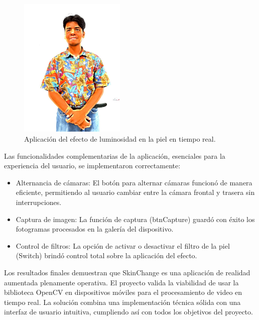 \documentclass[conference]{IEEEtran}
\begin{document}
\begin{figure}[htbp]
\centering
\includegraphics[width=0.45\textwidth]{Imagenes/ejemplo_efecto_aplicado.jpg}
\caption{Aplicación del efecto de luminosidad en la piel en tiempo real.}
\label{fig:efecto_luminosidad}
\end{figure}

Las funcionalidades complementarias de la aplicación, esenciales para la experiencia del usuario, se implementaron correctamente:
\begin{itemize}
\item Alternancia de cámaras: El botón para alternar cámaras funcionó de manera eficiente, permitiendo al usuario cambiar entre la cámara frontal y trasera sin interrupciones.
\item Captura de imagen: La función de captura (btnCapture) guardó con éxito los fotogramas procesados en la galería del dispositivo.
\item Control de filtros: La opción de activar o desactivar el filtro de la piel (Switch) brindó control total sobre la aplicación del efecto.
\end{itemize}

Los resultados finales demuestran que SkinChange es una aplicación de realidad aumentada plenamente operativa. El proyecto valida la viabilidad de usar la biblioteca OpenCV en dispositivos móviles para el procesamiento de video en tiempo real. La solución combina una implementación técnica sólida con una interfaz de usuario intuitiva, cumpliendo así con todos los objetivos del proyecto.
\end{document}
